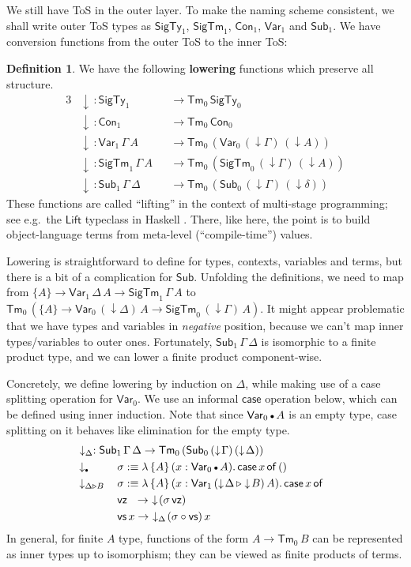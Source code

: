 \documentclass[12pt,a4paper,twoside,openany]{book}
\theoremstyle{remark}
\theoremstyle{definition}
\newtheorem{mydefinition}{Definition}
\theoremstyle{theorem}
\newcommand{\ms}[1]{\mathsf{#1}}
\newcommand{\Con}{\mathsf{Con}}
\newcommand{\Sub}{\mathsf{Sub}}
\newcommand{\Tm}{\mathsf{Tm}}
\newcommand{\ext}{\triangleright}
\newcommand{\emptycon}{\scaleobj{.75}\bullet}
\newcommand{\SigTy}{\mathsf{SigTy}}
\newcommand{\SigTm}{\mathsf{SigTm}}
\newcommand{\Var}{\ms{Var}}
\newcommand{\vz}{\ms{vz}}
\newcommand{\vs}{\ms{vs}}
\newcommand{\down}{\downarrow}
\newcommand{\defn}{:\equiv}
\begin{document}
We still have ToS in the outer layer. To make the naming
scheme consistent, we shall write outer ToS types as $\SigTy_1$,
$\SigTm_1$, $\Con_1$, $\Var_1$ and $\Sub_1$. We have conversion functions from
the outer ToS to the inner ToS:
\begin{mydefinition} We have the following \textbf{lowering} functions which
preserve all structure.
\begin{alignat*}{3}
  & \down\,: \SigTy_1 &&\to \Tm_0\,\SigTy_0\\
  & \down\,: \Con_1 &&\to \Tm_0\,\Con_0\\
  & \down\,: \Var_1\,\Gamma\,A &&\to \Tm_0\,(\Var_0\,(\down\!\Gamma)\,(\down\!A))\\
  & \down\,: \SigTm_1\,\Gamma\,A &&\to \Tm_0\,(\SigTm_0\,(\down\!\Gamma)\,(\down\!A))\\
  & \down\,: \Sub_1\,\Gamma\,\Delta &&\to \Tm_0\,(\Sub_0\,(\down\!\Gamma)\,(\down\!\delta))
\end{alignat*}
These functions are called ``lifting'' in the context of multi-stage
programming; see e.g.\ the $\ms{Lift}$ typeclass in Haskell
\cite{pickering-multistage}. There, like here, the point is to build
object-language terms from meta-level (``compile-time'') values.

Lowering is straightforward to define for types, contexts, variables and terms,
but there is a bit of a complication for $\Sub$. Unfolding the definitions, we
need to map from $\{A\} \to \Var_1\,\Delta\,A \to \SigTm_1\,\Gamma\,A$ to
$\Tm_0\,(\{A\} \to \Var_0\,(\down\Delta)\,A \to \SigTm_0\,(\down\Gamma)\,A)$. It
might appear problematic that we have types and variables in \emph{negative}
position, because we can't map inner types/variables to outer ones.
Fortunately, $\Sub_1\,\Gamma\,\Delta$ is isomorphic to a finite product type,
and we can lower a finite product component-wise.

Concretely, we define lowering by induction on $\Delta$, while making use of
a case splitting operation for $\Var_0$. We use an informal $\ms{case}$
operation below, which can be defined using inner induction. Note that since
$\Var_0\,\emptycon\,A$ is an empty type, case splitting on it behaves like
elimination for the empty type.
\begin{alignat*}{3}
  &\rlap{$\hspace{0.3em}\down_{\Delta} : \Sub_1\,\Gamma\,\Delta \to \Tm_0\,(\Sub_0\,(\down\!\Gamma)\,(\down\!\Delta))$}\\
  &\down_{\emptycon}\,&&\sigma \defn
      \lambda\,\{A\}\,(x : \Var_0\,\emptycon\,A).\,\ms{case}\,x\,\ms{of}\,()\\
  &\down_{\Delta\ext B}\,&&\sigma \defn
      \lambda\,\{A\}\,(x : \Var_1\,(\down\!\Delta\,\ext \down\!B)\,A).\,\ms{case}\,x\,\ms{of}\\
  & &&\vz\hspace{0.65em}\to\,\,\down\!(\sigma\,\vz)\\
  & &&\vs\,x \to\,\,\down_{\Delta}\!(\sigma \circ \vs)\,x
\end{alignat*}
In general, for finite $A$ type, functions of the form $A \to \Tm_0\,B$ can be
represented as inner types up to isomorphism; they can be viewed as finite
products of terms.


\end{mydefinition}
\end{document}
